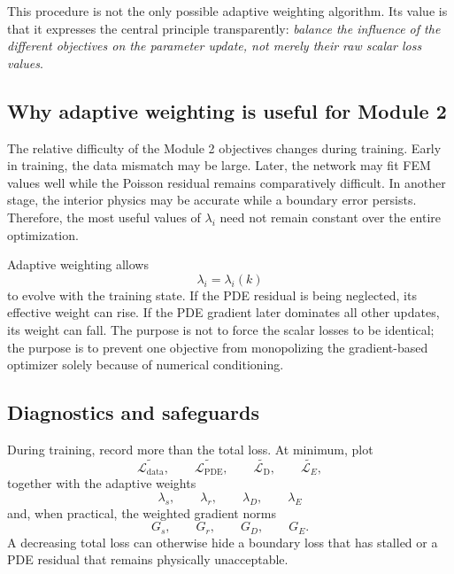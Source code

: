 \documentclass[11pt]{article}
\newcommand{\Ldata}{\mathcal{L}_{\mathrm{data}}}
\newcommand{\Lpde}{\mathcal{L}_{\mathrm{PDE}}}
\newcommand{\Ldir}{\mathcal{L}_{\mathrm{D}}}
\newcommand{\LE}{\mathcal{L}_{E}}
\begin{document}
This procedure is not the only possible adaptive weighting algorithm. Its value is that it expresses the central principle transparently: \emph{balance the influence of the different objectives on the parameter update, not merely their raw scalar loss values}.

\subsection{Why adaptive weighting is useful for Module 2}

The relative difficulty of the Module 2 objectives changes during training. Early in training, the data mismatch may be large. Later, the network may fit FEM values well while the Poisson residual remains comparatively difficult. In another stage, the interior physics may be accurate while a boundary error persists. Therefore, the most useful values of $\lambda_i$ need not remain constant over the entire optimization.

Adaptive weighting allows
\begin{equation}
\lambda_i=\lambda_i(k)
\end{equation}
to evolve with the training state. If the PDE residual is being neglected, its effective weight can rise. If the PDE gradient later dominates all other updates, its weight can fall. The purpose is not to force the scalar losses to be identical; the purpose is to prevent one objective from monopolizing the gradient-based optimizer solely because of numerical conditioning.

\subsection{Diagnostics and safeguards}

During training, record more than the total loss. At minimum, plot
\begin{equation}
\widetilde{\Ldata},\qquad
\widetilde{\Lpde},\qquad
\widetilde{\Ldir},\qquad
\widetilde{\LE},
\end{equation}
together with the adaptive weights
\begin{equation}
\lambda_s,\qquad\lambda_r,\qquad\lambda_D,\qquad\lambda_E
\end{equation}
and, when practical, the weighted gradient norms
\begin{equation}
G_s,\qquad G_r,\qquad G_D,\qquad G_E.
\end{equation}
A decreasing total loss can otherwise hide a boundary loss that has stalled or a PDE residual that remains physically unacceptable.
\end{document}
